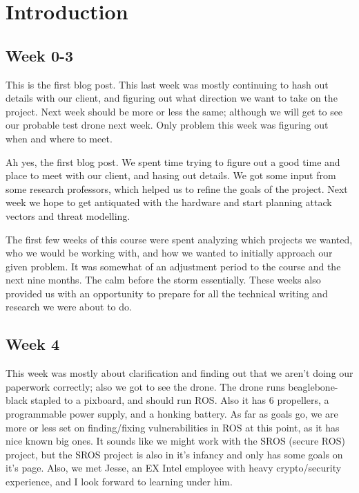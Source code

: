 \documentclass[IEEEtran,letterpaper,10pt,notitlepage,draftclsnofoot,onecolumn]{article}
\begin{document}
\newpage
{}
\tableofcontents
\clearpage

\section{Introduction}
\subsection{Week 0-3}
This is the first blog post. This last week was mostly continuing to hash out details with our client, and figuring out what direction we want to take on the project. Next week should be more or less the same; although we will get to see our probable test drone next week. Only problem this week was figuring out when and where to meet.

Ah yes, the first blog post. We spent time trying to figure out a good time and place to meet with our client, and hasing out details. We got some input from some research professors, which helped us to refine the goals of the project. Next week we hope to get antiquated with the hardware and start planning attack vectors and threat modelling.

The first few weeks of this course were spent analyzing which projects we wanted, who we would be working with, and how we wanted to initially approach our given problem. It was somewhat of an adjustment period to the course and the next nine months. The calm before the storm essentially. These weeks also provided us with an opportunity to prepare for all the technical writing and research we were about to do.

\subsection{Week 4}
This week was mostly about clarification and finding out that we aren't doing our paperwork correctly; also we got to see the drone. The drone runs beaglebone-black stapled to a pixboard, and should run ROS. Also it has 6 propellers, a programmable power supply, and a honking battery. 
As far as goals go, we are more or less set on finding/fixing vulnerabilities in ROS at this point, as it has nice known big ones. It sounds like we might work with the SROS (secure ROS) project, but the SROS project is also in it's infancy and only has some goals on it's page.
Also, we met Jesse, an EX Intel employee with heavy crypto/security experience, and I look forward to learning under him.
\end{document}
